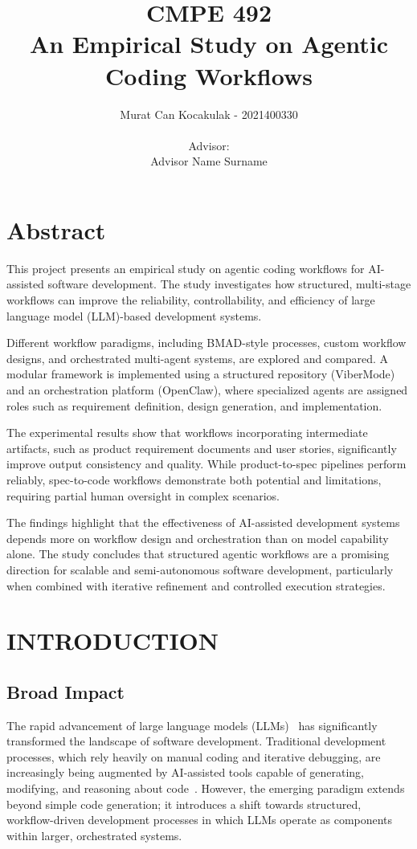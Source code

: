 \documentclass[a4paper,12pt]{report}
\newenvironment{abstract}{%
    \chapter*{Abstract}%
  }{%
  }%
\begin{document}
\title{CMPE 492 \\ An Empirical Study on Agentic Coding Workflows}
\author{
Murat Can Kocakulak - 2021400330 \\ \\
Advisor: \\ 
Advisor Name Surname
}
\date{}
\maketitle{}

\begin{abstract}
This project presents an empirical study on agentic coding workflows for AI-assisted software development. The study investigates how structured, multi-stage workflows can improve the reliability, controllability, and efficiency of large language model (LLM)-based development systems.

Different workflow paradigms, including BMAD-style processes, custom workflow designs, and orchestrated multi-agent systems, are explored and compared. A modular framework is implemented using a structured repository (ViberMode) and an orchestration platform (OpenClaw), where specialized agents are assigned roles such as requirement definition, design generation, and implementation.

The experimental results show that workflows incorporating intermediate artifacts, such as product requirement documents and user stories, significantly improve output consistency and quality. While product-to-spec pipelines perform reliably, spec-to-code workflows demonstrate both potential and limitations, requiring partial human oversight in complex scenarios.

The findings highlight that the effectiveness of AI-assisted development systems depends more on workflow design and orchestration than on model capability alone. The study concludes that structured agentic workflows are a promising direction for scalable and semi-autonomous software development, particularly when combined with iterative refinement and controlled execution strategies.
\end{abstract}

\tableofcontents

\chapter{INTRODUCTION}

\section{Broad Impact}
The rapid advancement of large language models (LLMs)~\cite{llm} has significantly transformed the landscape of software development. Traditional development processes, which rely heavily on manual coding and iterative debugging, are increasingly being augmented by AI-assisted tools capable of generating, modifying, and reasoning about code~\cite{codex,copilot}. However, the emerging paradigm extends beyond simple code generation; it introduces a shift towards structured, workflow-driven development processes in which LLMs operate as components within larger, orchestrated systems.
\end{document}
